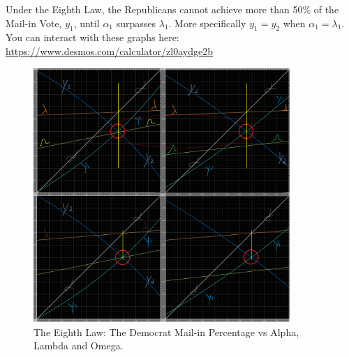 Under the Eighth Law, the Republicans cannot achieve more than 50\% of the Mail-in Vote, $y_{1}$, until $\alpha_{1}$ surpasses $\lambda_{1}$. More specifically $y_{1}=y_{2}$ when $\alpha_{1}=\lambda_{1}$. You can interact with these graphs here: \url{https://www.desmos.com/calculator/zl0aydge2b}
\begin{figure}[bp!]
\begin{center}
\caption{The Eighth Law: The Democrat Mail-in Percentage vs Alpha, Lambda and Omega.}
\includegraphics[width=275pt]{Fourth and Eigth Law.png}
\end{center}
\end{figure}
\newpage
